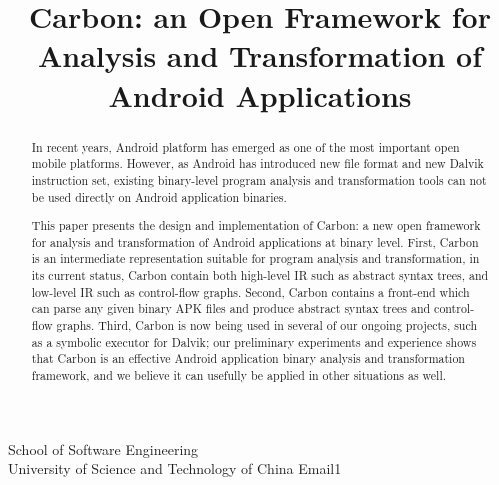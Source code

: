 \documentclass[preprint, cm]{sigplanconf}
\begin{document}
\setlength{\pdfpageheight}{\paperheight}
\setlength{\pdfpagewidth}{\paperwidth}






\title{Carbon: an Open Framework for Analysis and Transformation of Android Applications}

           {School of Software Engineering\\
           University of Science and Technology of China}
           {Email1}

\maketitle

\begin{abstract}
In recent years, Android platform has emerged as one of the most
important open mobile platforms. However, as Android has introduced
new file format and new Dalvik instruction set, existing binary-level
program analysis and transformation tools can not be used directly on
Android application binaries.

This paper presents the design and implementation of Carbon: a
new open framework for analysis and transformation of Android
applications at binary level. First, Carbon is an intermediate
representation suitable for program analysis and transformation, in
its current status, Carbon contain both high-level IR such as
abstract syntax trees, and low-level IR such as control-flow graphs. Second, Carbon
contains a front-end which can parse any given binary APK files and produce
abstract syntax trees and control-flow graphs. Third, Carbon is
now being used in several of
our ongoing projects, such as a symbolic executor for Dalvik; our
preliminary experiments and experience shows that Carbon is
an effective Android application binary analysis and transformation
framework, and we believe it can usefully be applied in other
situations as well.
\end{abstract}
\end{document}
